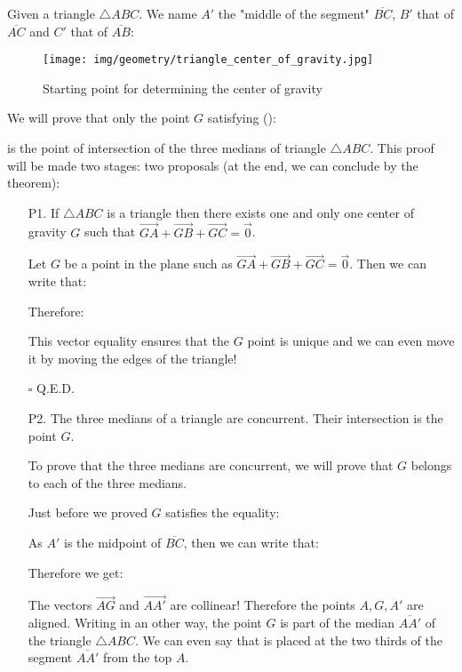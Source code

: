 {	\begin{theorem}
	Given a triangle $\triangle ABC$. We name $A'$ the "middle of the segment" $\overline{BC}$, $B'$ that of $\overline{AC}$ and $C'$ that of $\overline{AB}$:
	\begin{figure}[H]
		\centering
		\texttt{[image: img/geometry/triangle\_center\_of\_gravity.jpg]}
		\caption{Starting point for determining the center of gravity}
	\end{figure}
	We will prove that only the point $G$ satisfying ():
	
	is the point of intersection of the three medians of triangle $\triangle ABC$. This proof will be made two stages: two proposals (at the end, we can conclude by the theorem):
	\begin{enumerate}
		\item[P1.] If $\triangle ABC$ is a triangle then there exists one and only one center of gravity $G$ such that $\overrightarrow{GA}+\overrightarrow{GB}+\overrightarrow{GC}=\vec{0}$.
		\begin{dem}
		Let $G$ be a point in the plane such as $\overrightarrow{GA}+\overrightarrow{GB}+\overrightarrow{GC}=\vec{0}$. Then we can write that:
		
		Therefore:
		
		This vector equality ensures that the $G$ point is unique and we can even move it by moving the edges of the triangle!
		\begin{flushright}
			$\square$  Q.E.D.
		\end{flushright}
		\end{dem}
		\item[P2.] The three medians of a triangle are concurrent. Their intersection is the point $G$.
		\begin{dem}
		To prove that the three medians are concurrent, we will prove that $G$ belongs to each of the three medians.
		
		Just before we proved $G$ satisfies the equality:
		
		As $A'$ is the midpoint of $\overline{BC}$, then we can write that:
		
		Therefore we get:
		
		The vectors $\overrightarrow{AG}$ and $\overrightarrow{AA'}$ are collinear! Therefore the points $A, G, A'$ are aligned. Writing in an other way, the point $G$ is part of the median $\overline{AA'}$ of the triangle $\triangle ABC$. We can even say that is placed at the two thirds of the segment $\overline{AA'}$ from the top $A$.
		

\end{dem}
\end{enumerate}
\end{theorem}}
